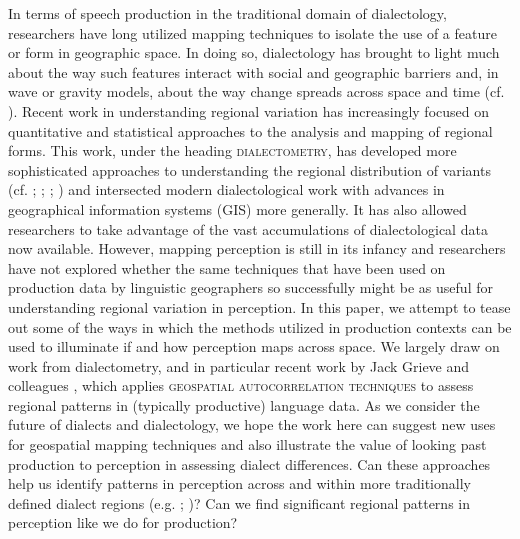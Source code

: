 \documentclass[output=paper]{LSP/langsci}
\begin{document}
In terms of speech production in the traditional domain of dialectology, researchers have long utilized mapping techniques to isolate the use of a feature or form in geographic space. In doing so, dialectology has brought to light much about the way such features interact with social and geographic barriers and, in wave or gravity models, about the way change spreads across space and time (cf. \citealt{chambers_dialectology_1998}). Recent work in understanding regional variation has increasingly focused on quantitative and statistical approaches to the analysis and mapping of regional forms. This work, under the heading \textsc{dialectometry}, has developed more sophisticated approaches to understanding the regional distribution of variants (cf. \citealt{lee_spatial_1993}; \citealt{nerbonne_introducing_2003}; \citealt{nerbonne_data-driven_2009}; \citealt{szmrecsanyi_grammatical_2012}) and intersected modern dialectological work with advances in geographical information systems (GIS) more generally. It has also allowed researchers to take advantage of the vast accumulations of dialectological data now available. However, mapping perception is still in its infancy and researchers have not explored whether the same techniques that have been used on production data by linguistic geographers so successfully might be as useful for understanding regional variation in perception.   
In this paper, we attempt to tease out some of the ways in which the methods utilized in production contexts can be used to illuminate if and how perception maps across space. We largely draw on work from dialectometry, and in particular recent work by Jack Grieve and colleagues \citep{grieve_corpus-based_2009,grieve_statistical_2011,grieve_multivariate_2013}, which applies \textsc{geospatial autocorrelation} \textsc{techniques} to assess regional patterns in (typically productive) language data. As we consider the future of dialects and dialectology, we hope the work here can suggest new uses for geospatial mapping techniques and also illustrate the value of looking past production to perception in assessing dialect differences. Can these approaches help us identify patterns in perception across and within more traditionally defined dialect regions (e.g. \citealt{carver_american_1987}; \citealt{labov_atlas_2006-1})? Can we find significant regional patterns in perception like we do for production?
\end{document}
